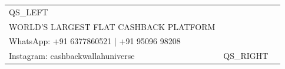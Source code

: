 \documentclass[a4paper,10pt]{article}
\begin{document}
\vspace{30pt}

\begin{center}
\begin{tabularx}{0.9\textwidth}{|X|X|X|}
\hline
QS_LEFT &
\begin{center}
\textbf{\LARGE CASHBACKWALLAH} \\
\textsf{WORLD'S LARGEST FLAT CASHBACK PLATFORM} \\
WhatsApp: +91 6377860521 | +91 95096 98208 \\
Instagram: cashbackwallahuniverse
\end{center}
&
QS_RIGHT \\
\hline
\end{tabularx}
\end{center}
\end{document}
